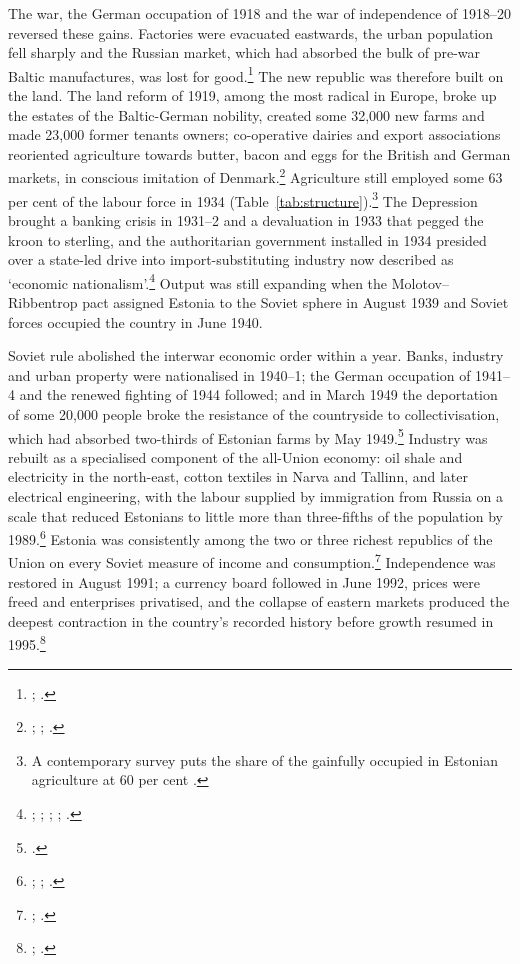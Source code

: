 \documentclass[12pt,a4paper]{article}
\begin{document}
The war, the German occupation of 1918 and the war of independence of 1918--20 reversed these gains. Factories were evacuated eastwards, the urban population fell sharply and the Russian market, which had absorbed the bulk of pre-war Baltic manufactures, was lost for good.\footnote{\autocite[107]{ehbaltics_tarvel}; \autocite[193--210]{koll1994gap}.} The new republic was therefore built on the land. The land reform of 1919, among the most radical in Europe, broke up the estates of the Baltic-German nobility, created some 32,000 new farms and made 23,000 former tenants owners; co-operative dairies and export associations reoriented agriculture towards butter, bacon and eggs for the British and German markets, in conscious imitation of Denmark.\footnote{\autocite[79--80]{jorgensen2006}; \autocite[108]{ehbaltics_tarvel}; \autocite[1, 3, 10]{norkus_denmarkisation}.} Agriculture still employed some 63 per cent of the labour force in 1934 (Table~\ref{tab:structure}).\footnote{A contemporary survey puts the share of the gainfully occupied in Estonian agriculture at 60 per cent \autocite[103]{balticstates1938}.} The Depression brought a banking crisis in 1931--2 and a devaluation in 1933 that pegged the kroon to sterling, and the authoritarian government installed in 1934 presided over a state-led drive into import-substituting industry now described as `economic nationalism'.\footnote{\autocite[74, 92, 100]{bernankejames01}; \autocite[41]{koll1998policy}; \autocite[11--29]{koll1998}; \autocite[118--35]{klesment2005}; \autocite[157--78]{feest2025}.} Output was still expanding when the Molotov--Ribbentrop pact assigned Estonia to the Soviet sphere in August 1939 and Soviet forces occupied the country in June 1940.

Soviet rule abolished the interwar economic order within a year. Banks, industry and urban property were nationalised in 1940--1; the German occupation of 1941--4 and the renewed fighting of 1944 followed; and in March 1949 the deportation of some 20,000 people broke the resistance of the countryside to collectivisation, which had absorbed two-thirds of Estonian farms by May 1949.\footnote{\autocite[100]{feest2014}.} Industry was rebuilt as a specialised component of the all-Union economy: oil shale and electricity in the north-east, cotton textiles in Narva and Tallinn, and later electrical engineering, with the labour supplied by immigration from Russia on a scale that reduced Estonians to little more than three-fifths of the population by 1989.\footnote{\autocite[111, 153--66]{case_estonia}; \autocite[3, 47]{ahderajasalu1992}; \autocite[154]{kasekamp2010}.} Estonia was consistently among the two or three richest republics of the Union on every Soviet measure of income and consumption.\footnote{\autocite[169]{schroeder1973}; \autocite[35--6]{bs_livingstandards1988}.} Independence was restored in August 1991; a currency board followed in June 1992, prices were freed and enterprises privatised, and the collapse of eastern markets produced the deepest contraction in the country's recorded history before growth resumed in 1995.\footnote{\autocite[2--7]{wb1993estonia}; \autocite[443--5, 457]{transition_progress}.}
\end{document}
